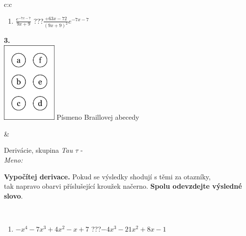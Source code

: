 \documentclass[10pt]{report}
\begin{document}
\begin{tabular}{c:c}
\begin{minipage}[c][104.5mm][t]{0.5\linewidth}
\begin{center}
\begin{minipage}{0.79\linewidth}
\begin{center}
\begin{varwidth}{\linewidth}
\begin{enumerate}
\item $\frac{e^{-7x-7}}{9x+9}$\quad \dotfill\; ???\;\dotfill \quad $\frac{+63x-72}{(9x+9)^2}e^{-7x-7}$
\end{enumerate}
\end{varwidth}
\end{center}
\end{minipage}
\begin{minipage}{0.20\linewidth}
\begin{center}
{\Huge\bfseries 3.} \\[2mm]
\includegraphics[height=40mm]{../images/braille.png}
{\small Písmeno Braillovej abecedy}
\end{center}
\end{minipage}
\end{center}
\end{minipage}
&
\begin{minipage}[c][104.5mm][t]{0.5\linewidth}
\begin{center}
\vspace{7mm}
{\huge Derivácie, skupina \textit{Tau $\tau$} -}\\[5mm]
\textit{Meno:}\phantom{xxxxxxxxxxxxxxxxxxxxxxxxxxxxxxxxxxxxxxxxxxxxxxxxxxxxxxxxxxxxxxxxx}\\[5mm]
\begin{minipage}{0.95\linewidth}
\begin{center}
\textbf{Vypočítej derivace.} Pokud se výsledky shodují s těmi za otazníky,\\tak napravo obarvi příslušející kroužek načerno. \textbf{Spolu odevzdejte výsledné slovo}.
\end{center}
\end{minipage}
\\[1mm]
\begin{minipage}{0.79\linewidth}
\begin{center}
\begin{varwidth}{\linewidth}
\begin{enumerate}
\normalsize
\item $-x^4-7x^3+4x^2-x+7$\quad \dotfill\; ???\;\dotfill \quad $-4x^3-21x^2+8x-1$

\end{enumerate}
\end{varwidth}
\end{center}
\end{minipage}
\end{center}
\end{minipage}
\end{tabular}
\end{document}
